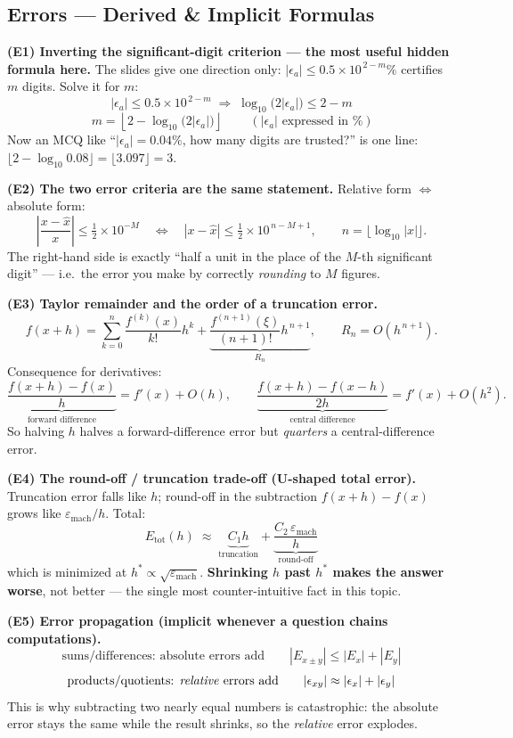\subsection{Errors --- Derived \& Implicit Formulas}

\begin{derivedbox}
\textbf{(E1) Inverting the significant-digit criterion --- the most useful hidden formula here.}
The slides give one direction only: $|\epsilon_a| \le 0.5\times10^{\,2-m}\%$ certifies $m$ digits. Solve it for $m$:
\[
|\epsilon_a| \le 0.5\times10^{\,2-m} \;\Longrightarrow\; \log_{10}\!\big(2|\epsilon_a|\big) \le 2-m
\]
\[
\boxed{\,m = \left\lfloor 2 - \log_{10}\!\big(2|\epsilon_a|\big)\right\rfloor\,}\qquad (|\epsilon_a| \text{ expressed in \%})
\]
Now an MCQ like ``$|\epsilon_a| = 0.04\%$, how many digits are trusted?'' is one line: $\lfloor 2-\log_{10}0.08\rfloor = \lfloor 3.097\rfloor = 3$.

\smallskip
\textbf{(E2) The two error criteria are the same statement.} Relative form $\Leftrightarrow$ absolute form:
\[
\left|\frac{x-\hat x}{x}\right| \le \tfrac12\times10^{-M}
\quad\Longleftrightarrow\quad
|x-\hat x| \le \tfrac12\times10^{\,n-M+1},\qquad n = \lfloor\log_{10}|x|\rfloor .
\]
The right-hand side is exactly ``half a unit in the place of the $M$-th significant digit'' --- i.e.\ the error you make by correctly \emph{rounding} to $M$ figures.

\smallskip
\textbf{(E3) Taylor remainder and the order of a truncation error.}
\[
f(x+h) = \sum_{k=0}^{n}\frac{f^{(k)}(x)}{k!}h^k + \underbrace{\frac{f^{(n+1)}(\xi)}{(n+1)!}h^{\,n+1}}_{R_n}, \qquad R_n = O(h^{\,n+1}).
\]
Consequence for derivatives:
\[
\underbrace{\frac{f(x+h)-f(x)}{h}}_{\text{forward difference}} = f'(x) + O(h),
\qquad
\underbrace{\frac{f(x+h)-f(x-h)}{2h}}_{\text{central difference}} = f'(x) + O(h^2).
\]
So halving $h$ halves a forward-difference error but \emph{quarters} a central-difference error.

\smallskip
\textbf{(E4) The round-off / truncation trade-off (U-shaped total error).}
Truncation error falls like $h$; round-off in the subtraction $f(x+h)-f(x)$ grows like $\varepsilon_{\text{mach}}/h$. Total:
\[
E_{\text{tot}}(h) \;\approx\; \underbrace{C_1 h}_{\text{truncation}} + \underbrace{\frac{C_2\,\varepsilon_{\text{mach}}}{h}}_{\text{round-off}}
\]
which is minimized at $h^\ast \propto \sqrt{\varepsilon_{\text{mach}}}$. \textbf{Shrinking $h$ past $h^\ast$ makes the answer worse}, not better --- the single most counter-intuitive fact in this topic.

\smallskip
\textbf{(E5) Error propagation (implicit whenever a question chains computations).}
\[
\text{sums/differences: absolute errors add} \qquad |E_{x\pm y}| \le |E_x| + |E_y|
\]
\[
\text{products/quotients: \emph{relative} errors add} \qquad |\epsilon_{xy}| \approx |\epsilon_x| + |\epsilon_y|
\]
This is why subtracting two nearly equal numbers is catastrophic: the absolute error stays the same while the result shrinks, so the \emph{relative} error explodes.
\end{derivedbox}

